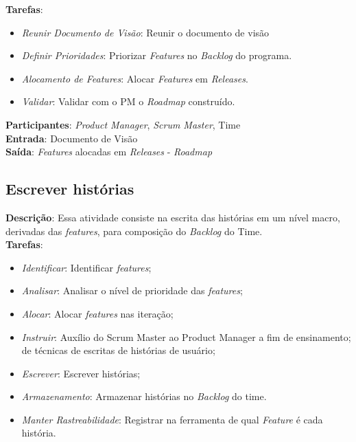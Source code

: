   \textbf{Tarefas}:
  \begin{itemize}
   \item \indent \textit{Reunir Documento de Visão}: Reunir o documento de visão

   \item \indent \textit{Definir Prioridades}: Priorizar \textit{Features} no \textit{Backlog} do programa.

   \item \indent \textit{Alocamento de \textit{Features}}: Alocar \textit{Features} em \textit{Releases}.

   \item \indent \textit{Validar}: Validar com o PM o \textit{Roadmap} construído.
  \end{itemize}

  \textbf{Participantes}: \textit{Product Manager}, \textit{Scrum Master}, Time \\

  \textbf{Entrada}: Documento de Visão \\

  \textbf{Saída}:  \textit{Features} alocadas em \textit{Releases} - \textit{Roadmap}\\

  \subsection{Escrever histórias}
  \textbf{Descrição}: Essa atividade consiste na escrita das histórias em um nível macro, derivadas das \textit{features}, para composição do \textit{Backlog} do Time. \\

  \textbf{Tarefas}:
  \begin{itemize}
   \item \indent \textit{Identificar}: Identificar \textit{features};

   \item \indent \textit{Analisar}: Analisar o nível de prioridade das \textit{features};

   \item \indent \textit{Alocar}: Alocar \textit{features} nas iteração;

   \item \indent \textit{Instruir}: Auxílio do Scrum Master ao Product Manager a fim de ensinamento; de técnicas de escritas de histórias de usuário;

   \item \indent \textit{Escrever}: Escrever histórias;

   \item \indent \textit{Armazenamento}: Armazenar histórias no \textit{Backlog} do time.
   
   \item \indent \textit{Manter Rastreabilidade}: Registrar na ferramenta de qual \textit{Feature} é cada história.

  \end{itemize}


